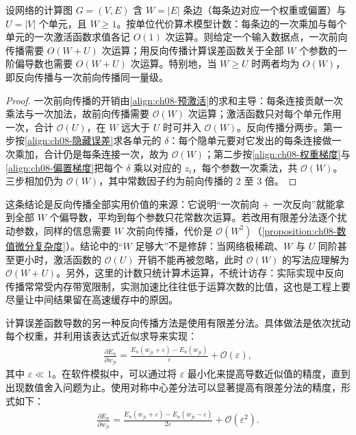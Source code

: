 \documentclass[../../main.tex]{subfiles}
\begin{document}
\begin{proposition}[反向传播的计算复杂度]\label{proposition:ch08-反向传播复杂度}
设网络的计算图 $G=(V,E)$ 含 $W=|E|$ 条边（每条边对应一个权重或偏置）与 $U=|V|$ 个单元，且 $W\geqslant1$。按单位代价算术模型计数：每条边的一次乘加与每个单元的一次激活函数求值各记 $O(1)$ 次运算。则给定一个输入数据点，一次前向传播需要 $O(W+U)$ 次运算；用反向传播计算误差函数关于全部 $W$ 个参数的一阶偏导数也需要 $O(W+U)$ 次运算。特别地，当 $W\geqslant U$ 时两者均为 $O(W)$，即反向传播与一次前向传播同一量级。
\end{proposition}

\begin{proof}
一次前向传播的开销由\eqref{align:ch08-预激活}的求和主导：每条连接贡献一次乘法与一次加法，故前向传播需要 $\mathcal{O}(W)$ 次运算；激活函数只对每个单元作用一次，合计 $\mathcal{O}(U)$，在 $W$ 远大于 $U$ 时可并入 $\mathcal{O}(W)$。反向传播分两步。第一步按\eqref{align:ch08-隐藏误差}求各单元的 $\delta$：每个隐单元要对它发出的每条连接做一次乘加，合计仍是每条连接一次，故为 $\mathcal{O}(W)$；第二步按\eqref{align:ch08-权重梯度}与\eqref{align:ch08-偏置梯度}把每个 $\delta$ 乘以对应的 $z_i$，每个参数一次乘法，共 $\mathcal{O}(W)$。三步相加仍为 $\mathcal{O}(W)$，其中常数因子约为前向传播的 $2$ 至 $3$ 倍。
\end{proof}

\begin{remark}
\enlargethispage{2\baselineskip}
这条结论是反向传播全部实用价值的来源：它说明“一次前向 + 一次反向”就能拿到全部 $W$ 个偏导数，平均到每个参数只花常数次运算。若改用有限差分法逐个扰动参数，同样的信息需要 $W$ 次前向传播，代价是 $\mathcal{O}(W^{2})$（\cref{proposition:ch08-数值微分复杂度}）。结论中的“$W$ 足够大”不是修辞：当网络极稀疏、$W$ 与 $U$ 同阶甚至更小时，激活函数的 $\mathcal{O}(U)$ 开销不能再被忽略，此时 $\mathcal{O}(W)$ 的写法应理解为 $\mathcal{O}(W+U)$。另外，这里的计数只统计算术运算，不统计访存：实际实现中反向传播常常受内存带宽限制，实测加速比往往低于运算次数的比值，这也是工程上要尽量让中间结果留在高速缓存中的原因。
\end{remark}

计算误差函数导数的另一种反向传播方法是使用有限差分法。具体做法是依次扰动每个权重，并利用该表达式近似求导来实现：
\begin{align}
\frac{\partial E_n}{\partial w_{ji}}=\frac{E_n\left(w_{ji}+\varepsilon\right)-E_n\left(w_{ji}\right)}{\varepsilon}+\mathcal{O}(\varepsilon),
\label{align:ch08-有限差分}
\end{align}
其中 $\varepsilon\ll1$。在软件模拟中，可以通过将 $\varepsilon$ 最小化来提高导数近似值的精度，直到出现数值舍入问题为止。使用对称中心差分法可以显著提高有限差分法的精度，形式如下：
\begin{align}
\frac{\partial E_n}{\partial w_{ji}}=\frac{E_n\left(w_{ji}+\varepsilon\right)-E_n\left(w_{ji}-\varepsilon\right)}{2\varepsilon}+\mathcal{O}\left(\varepsilon^{2}\right).
\label{align:ch08-中心差分}
\end{align}
\end{document}
